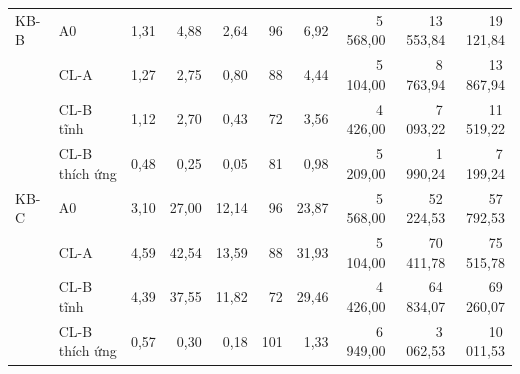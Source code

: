 \begin{tabular}{llrrrrrrrr}
\midrule
KB-B & A0 & 1{,}31 & 4{,}88 & 2{,}64 & 96 & 6{,}92 & 5\,568{,}00 & 13\,553{,}84 & 19\,121{,}84 \\
 & CL-A & 1{,}27 & 2{,}75 & 0{,}80 & 88 & 4{,}44 & 5\,104{,}00 & 8\,763{,}94 & 13\,867{,}94 \\
 & CL-B tĩnh & 1{,}12 & 2{,}70 & 0{,}43 & 72 & 3{,}56 & 4\,426{,}00 & 7\,093{,}22 & 11\,519{,}22 \\
 & CL-B thích ứng & 0{,}48 & 0{,}25 & 0{,}05 & 81 & 0{,}98 & 5\,209{,}00 & 1\,990{,}24 & 7\,199{,}24 \\
\midrule
KB-C & A0 & 3{,}10 & 27{,}00 & 12{,}14 & 96 & 23{,}87 & 5\,568{,}00 & 52\,224{,}53 & 57\,792{,}53 \\
 & CL-A & 4{,}59 & 42{,}54 & 13{,}59 & 88 & 31{,}93 & 5\,104{,}00 & 70\,411{,}78 & 75\,515{,}78 \\
 & CL-B tĩnh & 4{,}39 & 37{,}55 & 11{,}82 & 72 & 29{,}46 & 4\,426{,}00 & 64\,834{,}07 & 69\,260{,}07 \\
 & CL-B thích ứng & 0{,}57 & 0{,}30 & 0{,}18 & 101 & 1{,}33 & 6\,949{,}00 & 3\,062{,}53 & 10\,011{,}53 \\
\bottomrule
\end{tabular}
